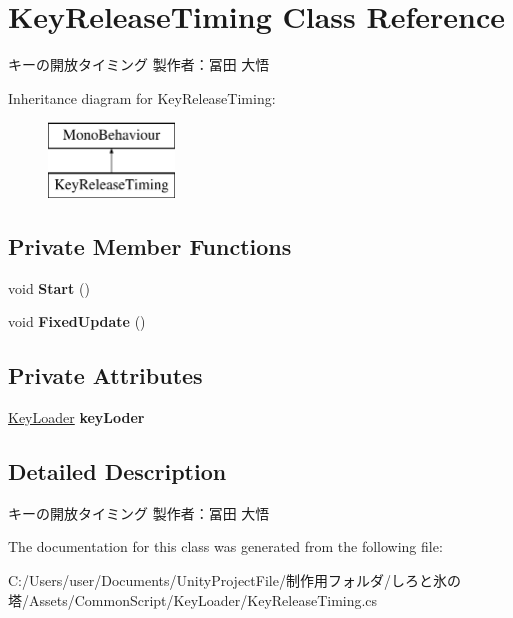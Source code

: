 \hypertarget{class_key_release_timing}{}\section{Key\+Release\+Timing Class Reference}
\label{class_key_release_timing}


キーの開放タイミング 製作者：冨田 大悟  


Inheritance diagram for Key\+Release\+Timing\+:\begin{figure}[H]
\begin{center}
\leavevmode
\includegraphics[height=2.000000cm]{class_key_release_timing}
\end{center}
\end{figure}
\subsection*{Private Member Functions}
\begin{DoxyCompactItemize}
\item 
\mbox{\label{class_key_release_timing_aa3e5accac48a68a49125ae5e3e87410c}} 
void {\bfseries Start} ()
\item 
\mbox{\label{class_key_release_timing_a76ef8ce04d3ef8bafa8e2ee7c2794e90}} 
void {\bfseries Fixed\+Update} ()
\end{DoxyCompactItemize}
\subsection*{Private Attributes}
\begin{DoxyCompactItemize}
\item 
\mbox{\label{class_key_release_timing_a6ce6d7f5206a538961f61561d241f5dd}} 
\hyperlink{class_key_loader}{Key\+Loader} {\bfseries key\+Loder}
\end{DoxyCompactItemize}


\subsection{Detailed Description}
キーの開放タイミング 製作者：冨田 大悟 



The documentation for this class was generated from the following file\+:\begin{DoxyCompactItemize}
\item 
C\+:/\+Users/user/\+Documents/\+Unity\+Project\+File/制作用フォルダ/しろと氷の塔/\+Assets/\+Common\+Script/\+Key\+Loader/Key\+Release\+Timing.\+cs\end{DoxyCompactItemize}
